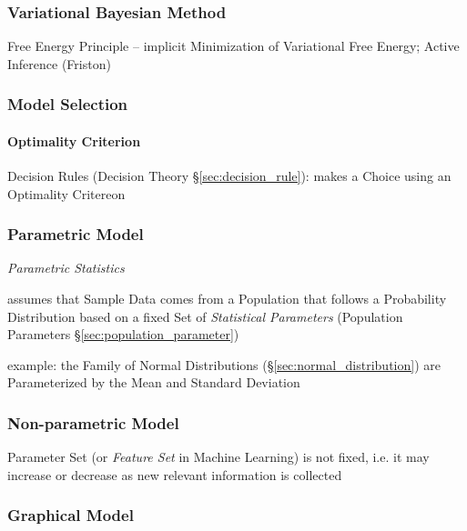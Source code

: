 \subsubsection{Variational Bayesian Method}
\label{sec:variational_bayesian_method}

Free Energy Principle -- implicit Minimization of Variational Free Energy;
Active Inference (Friston)



\subsubsection{Model Selection}\label{sec:model_selection}

\paragraph{Optimality Criterion}\label{sec:optimality_criterion}\hfill

\fist Decision Rules (Decision Theory \S\ref{sec:decision_rule}): makes a
Choice using an Optimality Critereon



\subsubsection{Parametric Model}\label{sec:parametric_model}

\emph{Parametric Statistics}

assumes that Sample Data comes from a Population that follows a Probability
Distribution based on a fixed Set of \emph{Statistical Parameters}
(Population Parameters \S\ref{sec:population_parameter})

example: the Family of Normal Distributions (\S\ref{sec:normal_distribution})
are Parameterized by the Mean and Standard Deviation



\subsubsection{Non-parametric Model}\label{sec:nonparametric_model}

Parameter Set (or \emph{Feature Set} in Machine Learning) is not fixed, i.e. it
may increase or decrease as new relevant information is collected



\subsubsection{Graphical Model}\label{sec:graphical_model}


